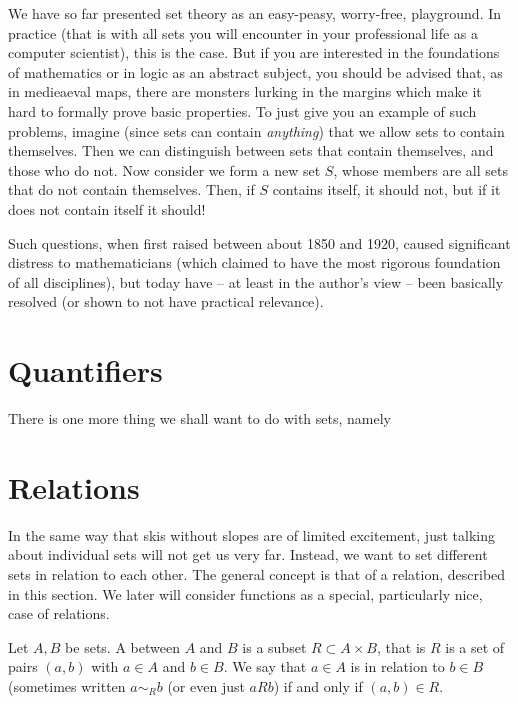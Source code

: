 \bonussection
We have so far presented set theory as an easy-peasy, worry-free,
playground. In practice (that is with all sets you will encounter in your
professional life as a computer scientist), this is the case. But if you are
interested in the foundations of mathematics or in logic as an abstract
subject, you should be advised that, as in medieaeval maps, there are
monsters lurking in the margins which make it hard to formally prove basic
properties. To just give you an example of such problems, imagine (since
sets can contain {\em anything}) that we allow sets to contain
themselves. Then we can distinguish
between sets that contain themselves, and those who do not. Now consider we
form a new set $S$, whose members are all sets that do not contain
themselves. Then, if $S$ contains itself, it should not, but if it does not
contain itself it should! 

Such questions, when first raised between about 1850 and 1920, caused significant
distress to mathematicians (which claimed to have the most rigorous foundation of all
disciplines), but today have -- at least in the author's view -- been basically
resolved (or shown to not have practical relevance).

\section{Quantifiers}

There is one more thing we shall want to do with sets, namely

\section{Relations}

In the same way that skis without slopes are of limited excitement, just
talking about individual sets will not get us very far. Instead, we want to
set different sets in relation to each other. The general concept is that of
a relation, described in this section. We later will consider functions as a
special, particularly nice, case of relations.

\begin{defn}
Let $A,B$ be sets. A  between $A$ and $B$ is a subset $R\subset
A\times B$, that is $R$ is a set of pairs $(a,b)$ with $a\in A$ and $b\in B$. We say
that $a\in A$ is in relation to $b\in B$ (sometimes written $a\sim_R b$ (or even just $aRb$) if and only if $(a,b)\in R$.
\end{defn}

